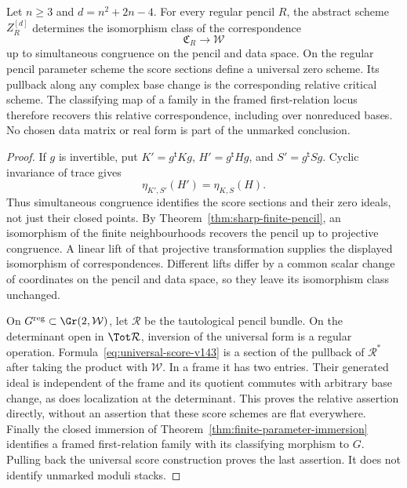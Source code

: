 \begin{theorem}
\label{thm:critical-correspondence-v143}
Let \(n\ge3\) and \(d=n^2+2n-4\).  For every regular pencil
\(R\), the abstract scheme \(Z_R^{[d]}\) determines the
isomorphism class of the correspondence
\[
                  \mathfrak C_R\longrightarrow\mathcal W
\]
up to simultaneous congruence on the pencil and data space.
On the regular pencil parameter scheme the score sections define a
universal zero scheme.  Its pullback along any complex base change
is the corresponding relative critical scheme.  The classifying map
of a family in the framed first-relation locus therefore recovers
this relative correspondence, including over nonreduced bases.
No chosen data matrix or real form is part of the unmarked conclusion.
\end{theorem}
\begin{proof}
If \(g\) is invertible, put
\(K'=g^{\mathsf t}Kg\), \(H'=g^{\mathsf t}Hg\), and
\(S'=g^{\mathsf t}Sg\).  Cyclic invariance of trace gives
\[
                  \eta_{K',S'}(H')=\eta_{K,S}(H).
\]
Thus simultaneous congruence identifies the score sections and their
zero ideals, not just their closed points.  By
Theorem~\ref{thm:sharp-finite-pencil}, an isomorphism of the finite
neighbourhoods recovers the pencil up to projective congruence.
A linear lift of that projective transformation supplies the displayed
isomorphism of correspondences.  Different lifts differ by a common
scalar change of coordinates on the pencil and data space, so they
leave its isomorphism class unchanged.

On \(G^{\mathrm{reg}}\subset\Gr(2,\mathcal W)\), let
\(\mathcal R\) be the tautological pencil bundle.  On the determinant
open in \(\Tot\mathcal R\), inversion of the universal form is a
regular operation.  Formula~\eqref{eq:universal-score-v143} is a
section of the pullback of \(\mathcal R^*\) after taking the product
with \(\mathcal W\).  In a frame it has two entries.  Their generated
ideal is independent of the frame and its quotient commutes with
arbitrary base change, as does localization at the determinant.
This proves the relative assertion directly, without an assertion
that these score schemes are flat everywhere.  Finally the closed
immersion of Theorem~\ref{thm:finite-parameter-immersion} identifies
a framed first-relation family with its classifying morphism to
\(G\).  Pulling back the universal score construction proves the
last assertion.  It does not identify unmarked moduli stacks.
\end{proof}

